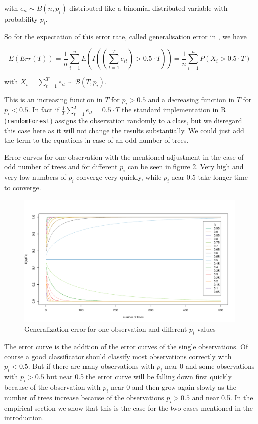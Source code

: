 \documentclass[paper=a4
               ,12pt
               ,DIV=12
               ,parskip=half
               ,titlepage=on
               ,headinclude 
               ,footinclude
               ,headsepline
               ,footsepline         %
               ,ilines 
               ]{scrartcl}
\begin{document}
with $e_{it} \sim B(n, p_i)$ distributed like a binomial distributed variable with probability $p_i$. 

So for the expectation of this error rate, called generalisation error in \citet{Breiman2001}, we have

\begin{equation}
 E(Err(T)) = \frac{1}{n} \sum_{i=1}^{n} E( I ((\sum_{t=1}^T e_{it} ) > 0.5 \cdot T)) = \frac{1}{n} \sum_{i=1}^{n} P(X_i > 0.5 \cdot T)
\end{equation}

with $X_i=\sum_{t=1}^Te_{it}\sim\mathcal{B}(T,p_i)$. 

This is an increasing function in $T$ for $p_i > 0.5$ and a decreasing function in $T$ for $p_i < 0.5$. 
In fact if $\frac{1}{T} \sum_{t=1}^T e_{it}  = 0.5 \cdot T$ the standard implementation in R (\texttt{randomForest}) assigns the observation randomly to a class, 
but we disregard this case here as it will not change the results substantially. We could just add the term to the equations in case of an odd number of trees. 

Error curves for one observation with the mentioned adjustment in the case of odd number of trees and for different $p_i$ can be seen in figure 2. Very high and very low numbers of $p_i$ converge very quickly, while $p_i$ near 0.5 take 
longer time to converge. 

\begin{figure}[!htb]
\begin{center}
  \includegraphics[width=\textwidth]{error_curves.pdf}
  \caption{Generalization error for one observation and different $p_i$ values}
\end{center}
\end{figure}

The error curve is the addition of the error curves of the single observations. Of course a good classificator should classify most observations correctly with $p_i < 0.5$. 
But if there are many observations with  $p_i$ near $0$ and some observations with $p_i > 0.5$ but near 0.5 the error curve 
will be falling down first quickly because of the observation with $p_i$ near $0$ and then grow again slowly as the number of trees increase because of the observations $p_i > 0.5$ and near 0.5. In the empirical section 
we show that this is the case for the two cases mentioned in the introduction. 
\end{document}
